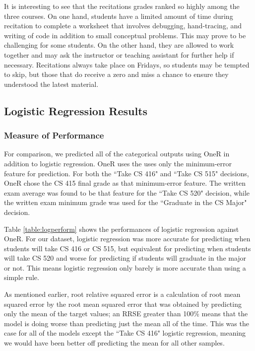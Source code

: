 \documentclass[letterpaper,11pt]{article}
\begin{document}
It is interesting to see that the recitations grades ranked so highly among the three courses.  On one hand, students have a limited amount of time during recitation to complete a worksheet that involves debugging, hand-tracing, and writing of code in addition to small conceptual problems.  This may prove to be challenging for some students.  On the other hand, they are allowed to work together and may ask the instructor or teaching assistant for further help if necessary.  Recitations always take place on Fridays, so students may be tempted to skip, but those that do receive a zero and miss a chance to ensure they understood the latest material.


\subsection{Logistic Regression Results}

\subsubsection{Measure of Performance}

For comparison, we predicted all of the categorical outputs using OneR in addition to logistic regression.  OneR uses the uses only the minimum-error feature for prediction.  For both the ``Take CS 416" and ``Take CS 515" decisions, OneR chose the CS 415 final grade as that minimum-error feature.  The written exam average was found to be that feature for the ``Take CS 520" decision, while the written exam minimum grade was used for the ``Graduate in the CS Major" decision.

Table \ref{table:logperform} shows the performances of logistic regression against OneR.  For our dataset, logistic regression was more accurate for predicting when students will take CS 416 or CS 515, but equivalent for predicting when students will take CS 520 and worse for predicting if students will graduate in the major or not.  This means logistic regression only barely is more accurate than using a simple rule.

As mentioned earlier, root relative squared error is a calculation of root mean squared error by the root mean squared error that was obtained by predicting only the mean of the target values; an RRSE greater than 100\% means that the model is doing worse than predicting just the mean all of the time.  This was the case for all of the models except the ``Take CS 416" logistic regression, meaning we would have been better off predicting the mean for all other samples.
\end{document}
